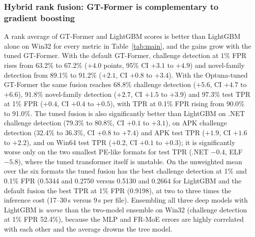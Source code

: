 \documentclass[fleqn,10pt]{wlscirep}
\newcommand{\gtf}{GT\mbox{-}Former}
\newcommand{\lgbm}{LightGBM}
\begin{document}
\subsubsection{Hybrid rank fusion: \gtf{} is complementary to gradient boosting}
\label{sec:fusion}
A rank average of \gtf{} and \lgbm{} scores is better than \lgbm{} alone on Win32 for every metric in Table~\ref{tab:main}, and the gains grow with the tuned \gtf{}. With the default \gtf{}, challenge detection at 1\% FPR rises from 63.2\% to 67.2\% ($+4.0$ points, 95\% CI $+3.1$ to $+4.9$) and novel-family detection from 89.1\% to 91.2\% ($+2.1$, CI $+0.8$ to $+3.4$). With the Optuna-tuned \gtf{} the same fusion reaches 68.8\% challenge detection ($+5.6$, CI $+4.7$ to $+6.6$), 91.8\% novel-family detection ($+2.7$, CI $+1.5$ to $+3.9$) and 97.3\% test TPR at 1\% FPR ($+0.4$, CI $+0.4$ to $+0.5$), with TPR at 0.1\% FPR rising from 90.0\% to 91.0\%. The tuned fusion is also significantly better than \lgbm{} on .NET challenge detection (79.3\% to 80.8\%, CI $+0.1$ to $+3.1$), on APK challenge detection (32.4\% to 36.3\%, CI $+0.8$ to $+7.4$) and APK test TPR ($+1.9$, CI $+1.6$ to $+2.2$), and on Win64 test TPR ($+0.2$, CI $+0.1$ to $+0.3$); it is significantly worse only on the two smallest PE-like formats for test TPR (.NET $-0.4$, ELF $-5.8$), where the tuned transformer itself is unstable. On the unweighted mean over the six formats the tuned fusion has the best challenge detection at 1\% and 0.1\% FPR (0.5344 and 0.2750 versus 0.5130 and 0.2664 for \lgbm{} and the default fusion the best TPR at 1\% FPR (0.9198), at two to three times the inference cost (17--30\,\textmu s versus 9\,\textmu s per file). Ensembling all three deep models with \lgbm{} is \emph{worse} than the two-model ensemble on Win32 (challenge detection at 1\% FPR 52.4\%), because the MLP and FR-MoE errors are highly correlated with each other and the average drowns the tree model.
\end{document}
